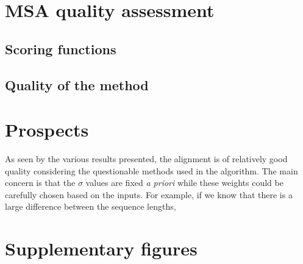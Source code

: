 \documentclass[12pt,a4paper]{article}
\begin{document}
\section{MSA quality assessment}

\subsection{Scoring functions}

\subsection{Quality of the method}



\section{Prospects}

As seen by the various results presented, the alignment is of relatively good quality considering the questionable methods used in the algorithm.
The main concern is that the $\sigma$ values are fixed \emph{a priori} while these weights could be carefully chosen based on the inputs.
For example, if we know that there is a large difference between the sequence lengths, 




\section*{Supplementary figures}
\end{document}
